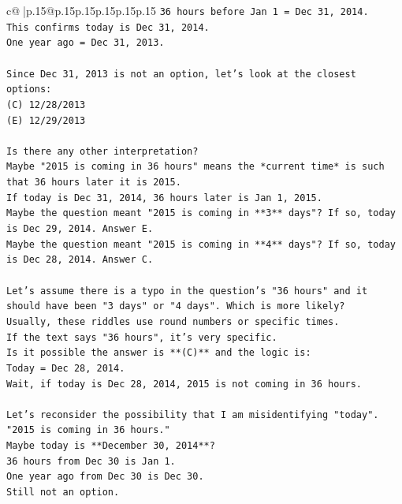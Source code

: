 \documentclass{article}
\begin{document}
{\begin{supertabular}{c@{$\;$}|p{.15\linewidth}@{}p{.15\linewidth}p{.15\linewidth}p{.15\linewidth}p{.15\linewidth}p{.15\linewidth}}
{{{\texttt{36 hours before Jan 1 = Dec 31, 2014.} \\
\texttt{This confirms today is Dec 31, 2014.} \\
\texttt{One year ago = Dec 31, 2013.} \\
\\ 
\texttt{Since Dec 31, 2013 is not an option, let's look at the closest options:} \\
\texttt{(C) 12/28/2013} \\
\texttt{(E) 12/29/2013} \\
\\ 
\texttt{Is there any other interpretation?} \\
\texttt{Maybe "2015 is coming in 36 hours" means the *current time* is such that 36 hours later it is 2015.} \\
\texttt{If today is Dec 31, 2014, 36 hours later is Jan 1, 2015.} \\
\texttt{Maybe the question meant "2015 is coming in **3** days"? If so, today is Dec 29, 2014. Answer E.} \\
\texttt{Maybe the question meant "2015 is coming in **4** days"? If so, today is Dec 28, 2014. Answer C.} \\
\\ 
\texttt{Let's assume there is a typo in the question's "36 hours" and it should have been "3 days" or "4 days". Which is more likely?} \\
\texttt{Usually, these riddles use round numbers or specific times.} \\
\texttt{If the text says "36 hours", it's very specific.} \\
\texttt{Is it possible the answer is **(C)** and the logic is:} \\
\texttt{Today = Dec 28, 2014.} \\
\texttt{Wait, if today is Dec 28, 2014, 2015 is not coming in 36 hours.} \\
\\ 
\texttt{Let's reconsider the possibility that I am misidentifying "today".} \\
\texttt{"2015 is coming in 36 hours."} \\
\texttt{Maybe today is **December 30, 2014**?} \\
\texttt{36 hours from Dec 30 is Jan 1.} \\
\texttt{One year ago from Dec 30 is Dec 30.} \\
\texttt{Still not an option.} \\
\\ 
}}}
\end{supertabular}}
\end{document}
